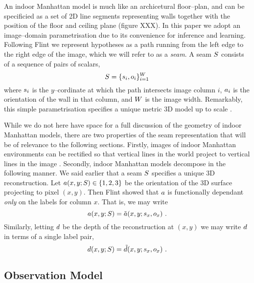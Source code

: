 An indoor Manhattan model is much like an archicetural floor--plan,
and can be specificied as a set of 2D line segments representing walls
together with the position of the floor and ceiling plane (figure
XXX). In this paper we adopt an image--domain parametrisation due to
its convenience for inference and learning. Following Flint \etal
\cite{Flint11} we represent hypotheses as a path running from the left
edge to the right edge of the image, which we will refer to as a
\textit{seam}. A seam $S$ consists of a sequence of pairs of
scalars,
\begin{equation}
  S = \{s_i,o_i\}_{i=1}^{W}
\end{equation}
where $s_i$ is the $y$--cordinate at which the path intersects
image column $i$, $a_i$ is the orientation of the wall in that
column, and $W$ is the image width. Remarkably, this simple
parametrisation specifies a unique metric 3D model up to scale
\cite{Flint11}.

While we do not here have space for a full discussion of the geometry
of indoor Manhattan models, there are two properties of the seam
representation that will be of relevance to the following
sections. Firstly, images of indoor Manhattan environments can be
rectified so that vertical lines in the world project to vertical
lines in the image \cite{Flint10eccv}. Secondly, indoor Manhattan
models decompose in the following manner. We said earlier that a seam
$S$ specifies a unique 3D reconstruction. Let
$a(x,y;S)\in\{1,2,3\}$ be the orientation of the 3D
surface projecting to pixel $(x,y)$. Then Flint \etal
\cite{Flint10eccv} showed that $a$ is functionally dependant
\textit{only} on the labels for column $x$. That is, we may write
\begin{equation}
  \label{eq:orient-indep}
  a(x,y;S) = \tilde{a}(x,y;s_x,o_x) ~.
\end{equation}
Similarly, letting $d$ be the depth of the reconstruction at
$(x,y)$ we may write $d$ in terms of a single label pair,
\cite{Flint10iccv}
\begin{equation}
  \label{eq:depth-indep}
  d(x,y;S) = \tilde{d}(x,y;s_x,o_x) ~.
\end{equation}

\subsection{Observation Model}

